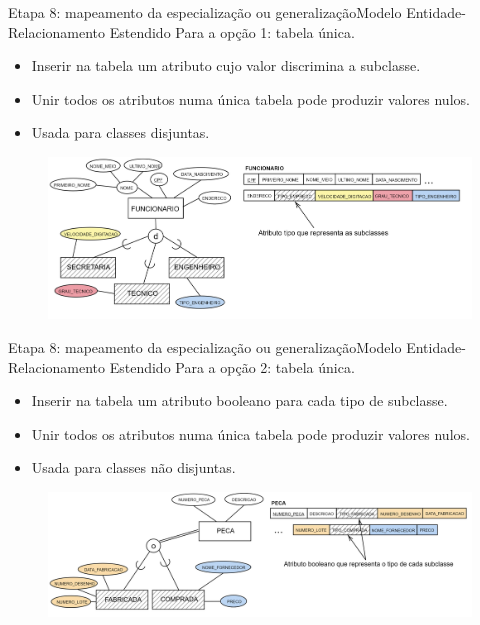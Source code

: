 \documentclass[t]{beamer}
\begin{document}

\begin{ftst}{Etapa 8: mapeamento da especialização ou generalização}{Modelo Entidade-Relacionamento Estendido}
\small
Para a opção 1: tabela única.
\begin{itemize}
    \item Inserir na tabela um atributo cujo valor discrimina a subclasse.
    \item Unir todos os atributos numa única tabela pode produzir valores nulos. 
    \item Usada para classes disjuntas.
\end{itemize}
\begin{figure}
    \centering
    \includegraphics[scale=0.11]{Figuras/03_13.png}
\end{figure}
\end{ftst}


\begin{ftst}{Etapa 8: mapeamento da especialização ou generalização}{Modelo Entidade-Relacionamento Estendido}
\small
Para a opção 2: tabela única.
\begin{itemize}
    \item Inserir na tabela um atributo booleano para cada tipo de subclasse.
    \item Unir todos os atributos numa única tabela pode produzir valores nulos. 
    \item Usada para classes não disjuntas.
\end{itemize}
\begin{figure}
    \centering
    \includegraphics[scale=0.11]{Figuras/03_14.png}
\end{figure}
\end{ftst}
\end{document}

